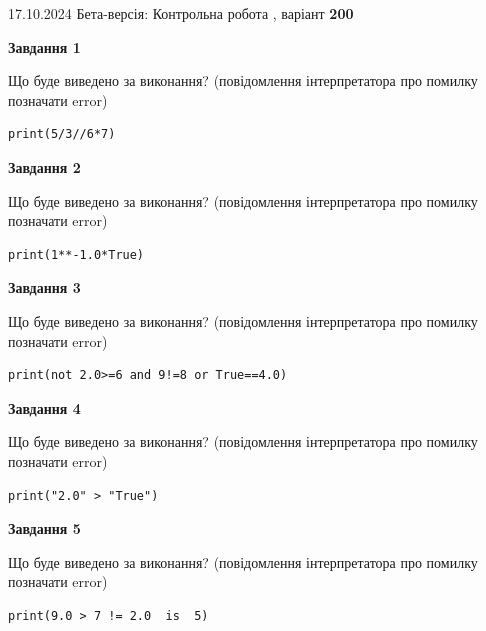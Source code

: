 \documentclass[12pt, ukrainian]{article}
\begin{document}
{\Large{17.10.2024 Бета-версія: Контрольна робота , варіант  \No \textbf { 200 }\par}}
{
\begin {large}
{\begin {center}\textbf{Завдання 1}\end {center}}

Що буде виведено за виконання? (повідомлення інтерпретатора про помилку позначати error)\par
\begin{verbatim}
print(5/3//6*7)
\end{verbatim}

{\begin {center}\textbf{Завдання 2}\end {center}}

Що буде виведено за виконання? (повідомлення інтерпретатора про помилку позначати error)\par
\begin{verbatim}
print(1**-1.0*True)
\end{verbatim}

{\begin {center}\textbf{Завдання 3}\end {center}}

Що буде виведено за виконання? (повідомлення інтерпретатора про помилку позначати error)\par
\begin{verbatim}
print(not 2.0>=6 and 9!=8 or True==4.0)
\end{verbatim}

{\begin {center}\textbf{Завдання 4}\end {center}}

Що буде виведено за виконання? (повідомлення інтерпретатора про помилку позначати error)\par
\begin{verbatim}
print("2.0" > "True")
\end{verbatim}

{\begin {center}\textbf{Завдання 5}\end {center}}

Що буде виведено за виконання? (повідомлення інтерпретатора про помилку позначати error)\par
\begin{verbatim}
print(9.0 > 7 != 2.0  is  5)
\end{verbatim}


\end{large}}
\end{document}
